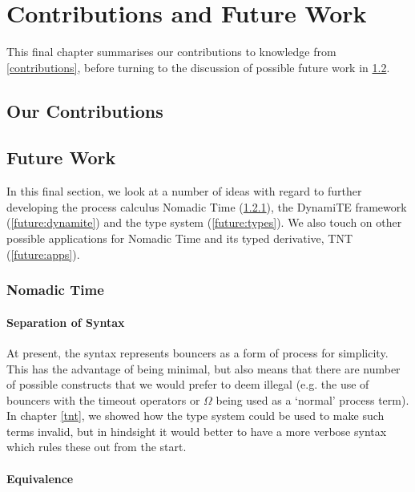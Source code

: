 \chapter{Contributions and Future Work}
\label{futurework}

This final chapter summarises our contributions to knowledge from
\ref{contributions}, before turning to the discussion of possible future
work in \ref{futureworksect}.

\section{Our Contributions}
\label{ourcontributions}

\section{Future Work}
\label{futureworksect}

In this final section, we look at a number of ideas with regard to
further developing the process calculus Nomadic Time
(\ref{future:nt}), the DynamiTE framework (\ref{future:dynamite}) and
the type system (\ref{future:types}).  We also touch on other possible
applications for Nomadic Time and its typed derivative, TNT
(\ref{future:apps}).

\subsection{Nomadic Time}
\label{future:nt}

\subsubsection{Separation of Syntax}

At present, the syntax represents bouncers as a form of process for
simplicity.  This has the advantage of being minimal, but also means
that there are number of possible constructs that we would prefer to
deem illegal (e.g. the use of bouncers with the timeout operators or
$\Omega$ being used as a `normal' process term).  In chapter
\ref{tnt}, we showed how the type system could be used to make such
terms invalid, but in hindsight it would better to have a more verbose
syntax which rules these out from the start.

\subsubsection{Equivalence}

